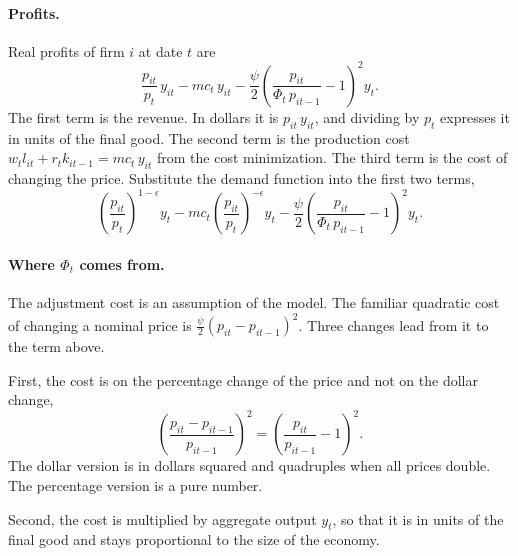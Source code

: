 \documentclass[11pt]{article}
\begin{document}
\paragraph{Profits.} Real profits of firm $i$ at date $t$ are
\begin{equation*}
\frac{p_{it}}{p_t}\, y_{it} - mc_t\, y_{it} - \frac{\psi}{2} \left( \frac{p_{it}}{\Phi_t\, p_{it-1}} - 1 \right)^2 y_t .
\end{equation*}
The first term is the revenue. In dollars it is $p_{it}\, y_{it}$, and dividing by $p_t$ expresses it in units of the final good. The second term is the production cost $w_t l_{it} + r_t k_{it-1} = mc_t\, y_{it}$ from the cost minimization. The third term is the cost of changing the price. Substitute the demand function into the first two terms,
\begin{equation*}
\left( \frac{p_{it}}{p_t} \right)^{1-\epsilon} y_t - mc_t \left( \frac{p_{it}}{p_t} \right)^{-\epsilon} y_t - \frac{\psi}{2} \left( \frac{p_{it}}{\Phi_t\, p_{it-1}} - 1 \right)^2 y_t .
\end{equation*}

\paragraph{Where $\Phi_t$ comes from.} The adjustment cost is an assumption of the model. The familiar quadratic cost of changing a nominal price is $\frac{\psi}{2} (p_{it} - p_{it-1})^2$. Three changes lead from it to the term above.

First, the cost is on the percentage change of the price and not on the dollar change,
\begin{equation*}
\left( \frac{p_{it} - p_{it-1}}{p_{it-1}} \right)^2 = \left( \frac{p_{it}}{p_{it-1}} - 1 \right)^2 .
\end{equation*}
The dollar version is in dollars squared and quadruples when all prices double. The percentage version is a pure number.

Second, the cost is multiplied by aggregate output $y_t$, so that it is in units of the final good and stays proportional to the size of the economy.
\end{document}
